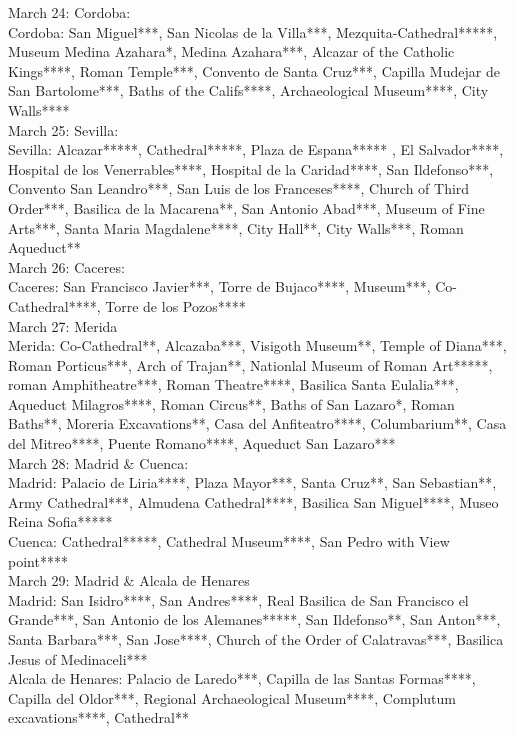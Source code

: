 March 24: Cordoba:\\

Cordoba: San Miguel***, San Nicolas de la Villa***, Mezquita-Cathedral*****, Museum Medina Azahara*, Medina Azahara***, Alcazar of the Catholic Kings****, Roman Temple***, Convento de Santa Cruz***, Capilla Mudejar de San Bartolome***, 
Baths of the Califs****, Archaeological Museum****, City Walls****\\

March 25: Sevilla:\\

Sevilla: Alcazar*****, Cathedral*****, Plaza de Espana***** , El Salvador****, Hospital de los Venerrables****, Hospital de la Caridad****, San Ildefonso***, Convento San Leandro***, San Luis de los Franceses****, Church of Third Order***, Basilica de la Macarena**,
San Antonio Abad***, Museum of Fine Arts***, Santa Maria Magdalene****, City Hall**, City Walls***, Roman Aqueduct**\\

March 26: Caceres:\\

Caceres: San Francisco Javier***, Torre de Bujaco****, Museum***, Co-Cathedral****, Torre de los Pozos****\\

March 27: Merida\\

Merida: Co-Cathedral**, Alcazaba***, Visigoth Museum**, Temple of Diana***, Roman Porticus***, Arch of Trajan**, Nationlal Museum of Roman Art*****, roman Amphitheatre***, Roman Theatre****, Basilica Santa Eulalia***, Aqueduct Milagros****, Roman Circus**, Baths of San Lazaro*, Roman Baths**,  Moreria Excavations**, Casa del Anfiteatro****, Columbarium**, Casa del Mitreo****, Puente Romano****, Aqueduct San Lazaro***\\

March 28: Madrid \& Cuenca:\\

Madrid: Palacio de Liria****, Plaza Mayor***, Santa Cruz**, San Sebastian**, Army Cathedral***, Almudena Cathedral****, Basilica San Miguel****, Museo Reina Sofia*****\\
Cuenca: Cathedral*****, Cathedral Museum****, San Pedro with View point****\\

March 29: Madrid \& Alcala de Henares\\

Madrid: San Isidro****, San Andres****, Real Basilica de San Francisco el Grande***, San Antonio de los Alemanes*****, San Ildefonso**, San Anton***, Santa Barbara***, San Jose****, Church of the Order of Calatravas***, Basilica Jesus of Medinaceli***\\
Alcala de Henares: Palacio de Laredo***, Capilla de las Santas Formas****, Capilla del Oldor***, Regional Archaeological Museum****, Complutum excavations****, Cathedral**\\

